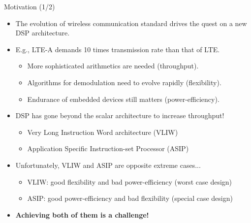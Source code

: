 \documentclass{beamer}
\begin{document}
\begin{CJK}{UTF8}{bkai}
    \begin{frame}{Motivation (1/2)}
        \begin{itemize}
            \item {
                    The evolution of wireless communication standard drives the quest on a new DSP architecture.
                }
            \item {
                    E.g., LTE-A demands 10 times transmission rate than that of LTE.
                    \begin{itemize}
                        \item {
                                More sophisticated arithmetics are needed (throughput).
                            }
                        \item {
                                Algorithms for demodulation need to evolve rapidly (flexibility).
                        }
                        \item {
                                Endurance of embedded devices still matters (power-efficiency).
                        }
                    \end{itemize}
                }
            \item{ 
                    DSP has gone beyond the scalar architecture to increase throughput!
                    \begin{itemize}
                        \item Very Long Instruction Word architecture (VLIW)
                        \item Application Specific Instruction-set Processor (ASIP)
                    \end{itemize}
                }
            \item {
                    Unfortunately, VLIW and ASIP are opposite extreme cases...
                    \begin{itemize}
                        \item VLIW: good flexibility and bad power-efficiency (worst case design)
                        \item ASIP: good power-efficiency and bad flexibility (special case design)
                    \end{itemize}
                }
            \item \large{\textbf{Achieving both of them is a challenge!}}
        \end{itemize}
    \end{frame}


\end{CJK}
\end{document}
